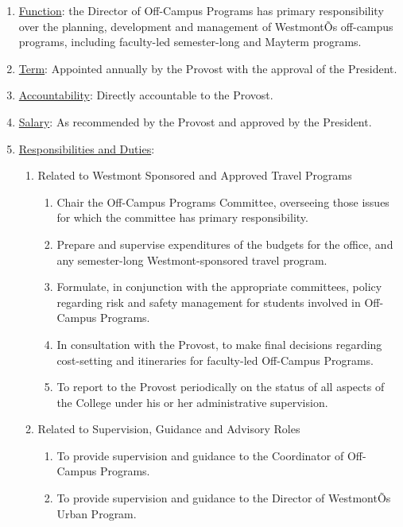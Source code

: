 \documentclass[letterpaper, 11pt]{article}
\newcounter{subsubparagraph}
\begin{document}
					\begin{enumerate}[label=\alph*)]
						\item{\underline{Function}:  the Director of Off-Campus Programs has primary responsibility over the planning, development and management of WestmontÕs off-campus programs, including faculty-led semester-long and Mayterm programs.}
						\item{\underline{Term}:  Appointed annually by the Provost with the approval of the President.}
						\item{\underline{Accountability}:  Directly accountable to the Provost.}
						\item{\underline{Salary}:  As recommended by the Provost and approved by the President.}
						\item{\underline{Responsibilities and Duties}:
							\begin{enumerate}[label=\arabic*)]
								\item{Related to Westmont Sponsored and Approved Travel Programs
									\begin{enumerate}[label=(\alph*)]
										\item{Chair the Off-Campus Programs Committee, overseeing those issues for which the committee has primary responsibility.}
										\item{Prepare and supervise expenditures of the budgets for the office, and any semester-long Westmont-sponsored travel program.}
										\item{Formulate, in conjunction with the appropriate committees, policy regarding risk and safety management for students involved in Off-Campus Programs.}
										\item{In consultation with the Provost, to make final decisions regarding cost-setting and itineraries for faculty-led Off-Campus Programs.}
										\item{To report to the Provost periodically on the status of all aspects of the College under his or her administrative supervision.}
									\end{enumerate}
								}
								\item{ Related to Supervision, Guidance and Advisory Roles
									\begin{enumerate}[label=(\alph*)]
										\item{To provide supervision and guidance to the Coordinator of Off-Campus Programs.}
										\item{To provide supervision and guidance to the Director of WestmontÕs Urban Program.}
									\end{enumerate}
								}
							\end{enumerate}
						}
					\end{enumerate}
\end{document}
